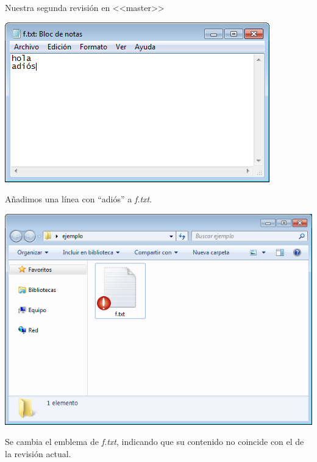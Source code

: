 \documentclass[xcolor=svgnames]{beamer}
\newcommand*{\fichero}[1]{\textit{#1}}
\begin{document}
\begin{frame}{Nuestra segunda revisión en <<master>>}

  \begin{overprint}
    \begin{center}
      \includegraphics[width=\textwidth,height=.6\textheight,keepaspectratio]{tomas/segundocommit-00-changedfile}

      Añadimos una línea con ``adiós'' a \fichero{f.txt}.
    \end{center}

    \begin{center}
      \includegraphics[width=\textwidth,height=.6\textheight,keepaspectratio]{tomas/segundocommit-01-emblem}

      Se cambia el emblema de \fichero{f.txt}, indicando que su contenido no coincide con el de la revisión actual.
    \end{center}


\end{overprint}
\end{frame}
\end{document}
